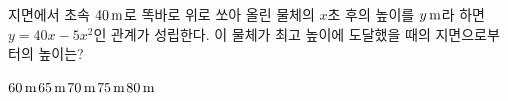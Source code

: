 \hspace*{2mm}\begin{minipage}[t]{\dimexpr\linewidth-2mm\relax}\vspace{0pt}
지면에서 초속 $40\mkern3mu \mathrm{m}$로 똑바로 위로 쏘아 올린 물체의 $x$초 후의 높이를 $y\mkern3mu \mathrm{m}$라 하면 $y=40x-5x^2$인 관계가 성립한다. 이 물체가 최고 높이에 도달했을 때의 지면으로부터의 높이는?
\begin{choices32}{$60\mkern3mu \mathrm{m}$}{$65\mkern3mu \mathrm{m}$}{$70\mkern3mu \mathrm{m}$}{$75\mkern3mu \mathrm{m}$}{$80\mkern3mu \mathrm{m}$}\end{choices32}\end{minipage}
